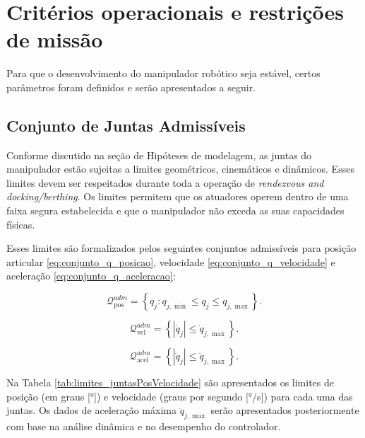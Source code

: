 \section{Critérios operacionais e restrições de missão}

Para que o desenvolvimento do manipulador robótico seja estável, certos parâmetros foram definidos e serão apresentados a seguir.

\subsection{Conjunto de Juntas Admissíveis}
\label{sec:conjunto_juntas}

Conforme discutido na seção de Hipóteses de modelagem, as juntas do manipulador estão sujeitas a limites geométricos, cinemáticos e dinâmicos. Esses limites devem ser respeitados durante toda a operação de \emph{rendezvous and docking/berthing}.
Os limites permitem que os atuadores operem dentro de uma faixa segura estabelecida e que o manipulador não exceda as suas capacidades físicas.

Esses limites são formalizados pelos seguintes conjuntos admissíveis para posição articular \eqref{eq:conjunto_q_posicao}, velocidade \eqref{eq:conjunto_q_velocidade} e aceleração \eqref{eq:conjunto_q_aceleracao}:

\begin{equation}
\label{eq:conjunto_q_posicao}
\mathcal{Q}_{\text{pos}}^{adm} =
\left\{ q_j : q_{j,\min} \leq q_j \leq q_{j,\max} \right\}.
\end{equation}

\begin{equation}
\label{eq:conjunto_q_velocidade}
\mathcal{Q}_{\text{vel}}^{adm} =
\left\{ |\dot{q}_j| \leq \dot{q}_{j,\max} \right\}.
\end{equation}

\begin{equation}
\label{eq:conjunto_q_aceleracao}
\mathcal{Q}_{\text{acel}}^{adm} =
\left\{ |\ddot{q}_j| \leq \ddot{q}_{j,\max} \right\}.
\end{equation}

Na Tabela \ref{tab:limites_juntasPosVelocidade} são apresentados os limites de posição (em graus [°]) e velocidade (graus por segundo [°/s]) para cada uma das juntas. Os dados de aceleração máxima $\ddot{q}_{j,\max}$ serão apresentados posteriormente com base na análise dinâmica e no desempenho do controlador.

